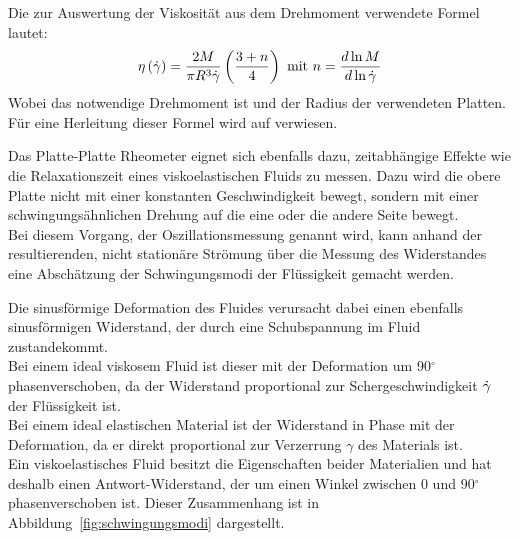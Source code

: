 Die zur Auswertung der Viskosität aus dem Drehmoment verwendete Formel lautet:
\begin{equation}
    \label{eq:platterheovisko}
    \eta\left( \dot\gamma \right) = \frac{2M}{\pi R^3 \dot\gamma}\left( \frac{3+n}{4} \right) \text{ mit } n=\frac{d\ln M}{d\ln\dot\gamma}
\end{equation}
Wobei  das notwendige Drehmoment ist und  der Radius der verwendeten Platten.
Für eine Herleitung dieser Formel wird auf \cite{introtorheo} verwiesen.

Das Platte-Platte Rheometer eignet sich ebenfalls dazu, zeitabhängige Effekte wie die Relaxationszeit eines viskoelastischen Fluids zu messen.
Dazu wird die obere Platte nicht mit einer konstanten Geschwindigkeit bewegt, sondern mit einer schwingungsähnlichen Drehung auf die eine oder die andere Seite bewegt.\\
Bei diesem Vorgang, der Oszillationsmessung genannt wird, kann anhand der resultierenden, nicht stationäre Strömung über die Messung des Widerstandes eine Abschätzung der Schwingungsmodi der Flüssigkeit gemacht werden.

Die sinusförmige Deformation  des Fluides verursacht dabei einen ebenfalls sinusförmigen Widerstand, der durch eine Schubspannung  im Fluid zustandekommt.\\
Bei einem ideal viskosem Fluid ist dieser mit der Deformation um 90$^\circ$ phasenverschoben, da der Widerstand proportional zur Schergeschwindigkeit $\dot\gamma$ der Flüssigkeit ist.\\
Bei einem ideal elastischen Material ist der Widerstand in Phase mit der Deformation, da er direkt proportional zur Verzerrung $\gamma$ des Materials ist.\\
Ein viskoelastisches Fluid besitzt die Eigenschaften beider Materialien und hat deshalb einen Antwort-Widerstand, der um einen Winkel zwischen 0 und 90$^\circ$ phasenverschoben ist. Dieser Zusammenhang ist in Abbildung~\ref{fig:schwingungsmodi} dargestellt.

